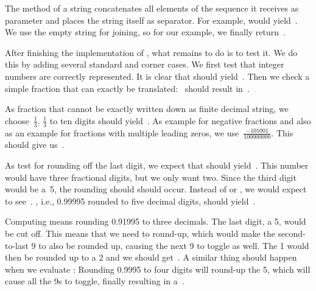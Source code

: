 The method  of a string concatenates all elements of the sequence it receives as parameter and places the string itself as separator.
For example,  would yield~.
We use the empty string for joining, so for our example, we finally return~.

After finishing the implementation of , what remains to do is to test it.
We do this by adding several standard and corner cases.
We first test that integer numbers are correctly represented.
It is clear that  should yield~.
Then we check a simple fraction that can exactly be translated:~ should result in~.


As fraction that cannot be exactly written down as finite decimal string, we choose~$\frac{1}{3}$.
$\frac{1}{3}$ to ten digits should yield~.
As example for negative fractions and also as an example for fractions with multiple leading zeros, we use~$\frac{-101001}{100000000}$.
This should give us~.

As test for rounding off the last digit, we expect that  should yield~.
This number would have three fractional digits, but we only want two.
Since the third digit would be a~5, the rounding should should occur.
Instead of  or , we would expect to see~.
, i.e., 0.99995 rounded to five decimal digits, should yield~.

Computing  means rounding 0.91995 to three decimals.
The last digit, a 5, would be cut off.
This means that we need to round-up, which would make the second-to-last 9 to also be rounded up, causing the next 9 to toggle as well.
The 1 would then be rounded up to a 2 and we should get~.
A similar thing should happen when we evaluate :
Rounding 0.9995 to four digits will round-up the 5, which will cause all the 9s to toggle, finally resulting in a~.

